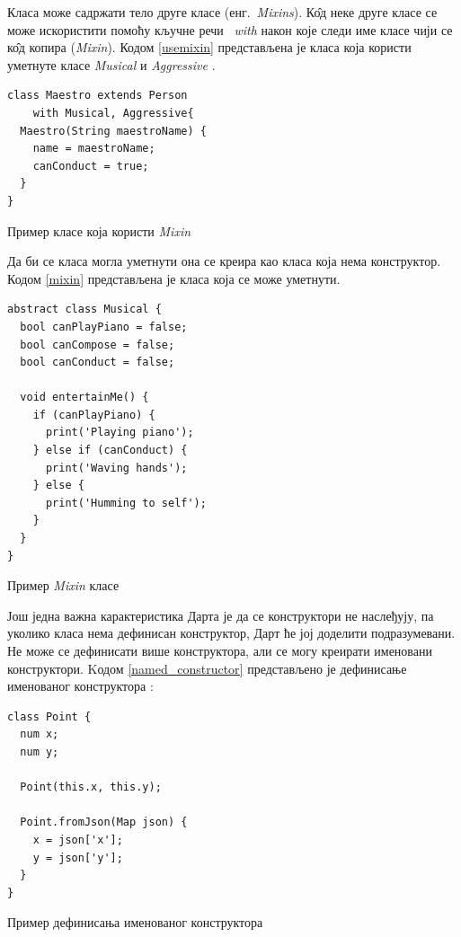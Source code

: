 \documentclass[12pt,oneside]{memoir}
\begin{document}
Класа може садржати тело друге класе (енг.~\textit{Mixins}). К\^{о}д неке друге класе се може искористити помоћу кључне речи ~\textit{with} након које следи име класе чији се к\^{о}д копира (\textit{Mixin}). Кодом \ref{usemixin} представљена је класа која користи уметнуте класе \textit{Musical} и \textit{Aggressive} \cite{dart, dart1}.

\begin{listing}
\begin{verbatim}
class Maestro extends Person
    with Musical, Aggressive{
  Maestro(String maestroName) {
    name = maestroName;
    canConduct = true;
  }
}
\end{verbatim}
\caption{Пример класе која користи \textit{Mixin}}
\label{usemixin}
\end{listing}

Да би се класа могла уметнути она се креира као класа која нема конструктор. Кодом \ref{mixin} представљена је класа која се може уметнути.

\begin{listing}
\begin{verbatim}
abstract class Musical {
  bool canPlayPiano = false;
  bool canCompose = false;
  bool canConduct = false;

  void entertainMe() {
    if (canPlayPiano) {
      print('Playing piano');
    } else if (canConduct) {
      print('Waving hands');
    } else {
      print('Humming to self');
    }
  }
}
\end{verbatim}
\caption{Пример \textit{Mixin} класе}
\label{mixin}
\end{listing}

Још једна важна карактеристика Дарта је да се конструктори не наслеђују, па уколико класа нема дефинисан конструктор, Дарт ће јој доделити подразумевани. Не може се дефинисати више конструктора, али се могу креирати именовани конструктори. Kодом \ref{named_constructor} представљено је дефинисање именованог конструктора \cite{dart, dart1}:
\begin{listing}
\begin{verbatim}
class Point {
  num x;
  num y;

  Point(this.x, this.y);

  Point.fromJson(Map json) {
    x = json['x'];
    y = json['y'];
  }
}
\end{verbatim}
\caption{Пример дефинисања именованог конструктора}
\label{named_constructor}
\end{listing}
\end{document}
